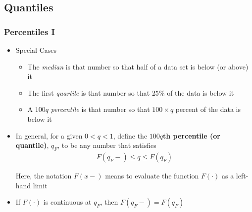 \documentclass{beamer}
\begin{document}
\subsection{Quantiles}

\begin{frame}[shrink=2]
\frametitle{Percentiles I}
\begin{itemize}
\item Special Cases \vspace{4mm}

\begin{itemize}
\item The \textit{median} is that number so that half of a data set is below (or above)
it \vspace{4mm}

\item The first \textit{quartile} is that number so that 25\% of the data is below
it \vspace{4mm}

\item A $100q$ \textit{percentile} is that number so that $100 \times q$ percent of the data is below
it \vspace{4mm}

\end{itemize}
\item In general, for a given $0<q<1$, define the \textbf{$100q$th percentile (or quantile)}, $q_F$, to be any number that satisfies
\begin{eqnarray*}
F(q_F-) \le q \le F(q_F)
\end{eqnarray*} \vspace{4mm}

Here, the notation $F(x-)$ means to evaluate the function $F(\cdot)$
as a left-hand limit \vspace{4mm}

\item If $F(\cdot)$ is continuous at $q_F$, then $F(q_F-) = F(q_F)$
\end{itemize}

\end{frame}
\end{document}
